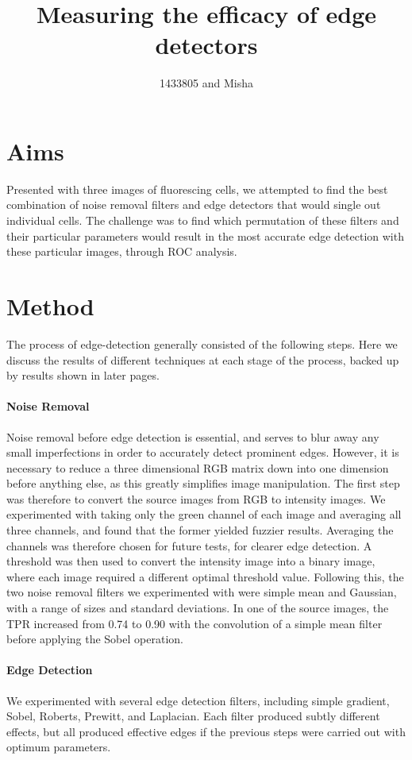 \documentclass[10pt,a4paper]{article}
\author{1433805 and Misha}
\title{Measuring the efficacy of edge detectors}
\begin{document}
\section*{Aims}
Presented with three images of fluorescing cells, we attempted to find the best combination of noise removal filters and edge detectors that would single out individual cells. The challenge was to find which permutation of these filters and their particular parameters would result in the most accurate edge detection with these particular images, through ROC analysis.

\section*{Method}
The process of edge-detection generally consisted of the following steps. Here we discuss the results of different techniques at each stage of the process, backed up by results shown in later pages.

\paragraph{Noise Removal}
Noise removal before edge detection is essential, and serves to blur away any small imperfections in order to accurately detect prominent edges. However, it is necessary to reduce a three dimensional RGB matrix down into one dimension before anything else, as this greatly simplifies image manipulation. The first step was therefore to convert the source images from RGB to intensity images. We experimented with taking only the green channel of each image and averaging all three channels, and found that the former yielded fuzzier results. Averaging the channels was therefore chosen for future tests, for clearer edge detection. A threshold was then used to convert the intensity image into a binary image, where each image required a different optimal threshold value. Following this, the two noise removal filters we experimented with were simple mean and Gaussian, with a range of sizes and standard deviations. In one of the source images, the TPR increased from 0.74 to 0.90 with the convolution of a simple mean filter before applying the Sobel operation.

\paragraph{Edge Detection}
We experimented with several edge detection filters, including simple gradient, Sobel, Roberts, Prewitt, and Laplacian. Each filter produced subtly different effects, but all produced effective edges if the previous steps were carried out with optimum parameters.
\end{document}
